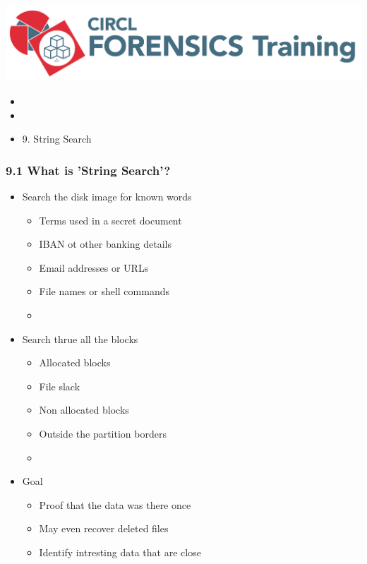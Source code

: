 

\begin{frame}
    \includegraphics[scale=0.3]{images/logo-circl-Forensics.png}
    \begin{itemize}
        \item[]
        \item[]
        \item[] 9. String Search
    \end{itemize}
\end{frame}


\begin{frame}[fragile]
  \frametitle{9.1 What is 'String Search'?}
    \begin{itemize}
       \item Search the disk image for known words
            \begin{itemize}
                \item Terms used in a secret document
                \item IBAN ot other banking details
                \item Email addresses or URLs
                \item File names or shell commands
		\item[]
            \end{itemize}
       \item Search thrue all the blocks
            \begin{itemize}
                \item Allocated blocks
                \item File slack
                \item Non allocated blocks
                \item Outside the partition borders
		\item[]
            \end{itemize}
       \item Goal
            \begin{itemize}
                \item Proof that the data was there once
                \item May even recover deleted files
                \item Identify intresting data that are close
            \end{itemize}
    \end{itemize}
\end{frame}


